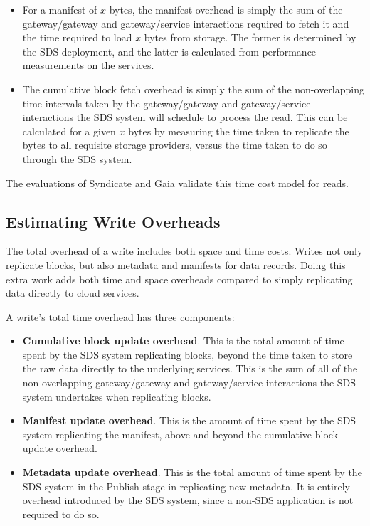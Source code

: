 \begin{itemize}
\item For a manifest of $x$ bytes, the manifest overhead is
simply the sum of the gateway/gateway and gateway/service interactions required
to fetch it and the time required to load $x$ bytes from storage.  The former is
determined by the SDS deployment, and the latter is calculated from performance
measurements on the services.
\item The cumulative block fetch overhead is simply the sum of the
non-overlapping time intervals taken by the gateway/gateway and gateway/service
interactions the SDS system will
schedule to process the read.  This can be calculated for a given $x$ bytes by
measuring the time taken to replicate the bytes to all requisite storage
providers, versus the time taken to do so through the SDS system.
\end{itemize}

The evaluations of Syndicate and Gaia validate this time cost model for
reads.

\subsection{Estimating Write Overheads}

The total overhead of a write includes both space and time costs.  Writes
not only replicate blocks, but also metadata and manifests for data records.
Doing this extra work adds both time and space overheads compared to simply replicating data
directly to cloud services.

A write's total time overhead has three components:

\begin{itemize}
\item \textbf{Cumulative block update overhead}.  This is the total amount of time spent
by the SDS system replicating blocks, beyond the time taken to store the raw
data directly to the underlying services.  This is the sum of all of the
non-overlapping gateway/gateway and gateway/service interactions the SDS system
undertakes when replicating blocks.

\item \textbf{Manifest update overhead}.  This is the amount of
time spent by the SDS system replicating the manifest, above
and beyond the cumulative block update overhead.

\item \textbf{Metadata update overhead}.  This is the total amount of time spent by the SDS
system in the Publish stage in replicating new metadata.  It is entirely
overhead introduced by the SDS system, since a non-SDS application is not required to
do so.
\end{itemize}

